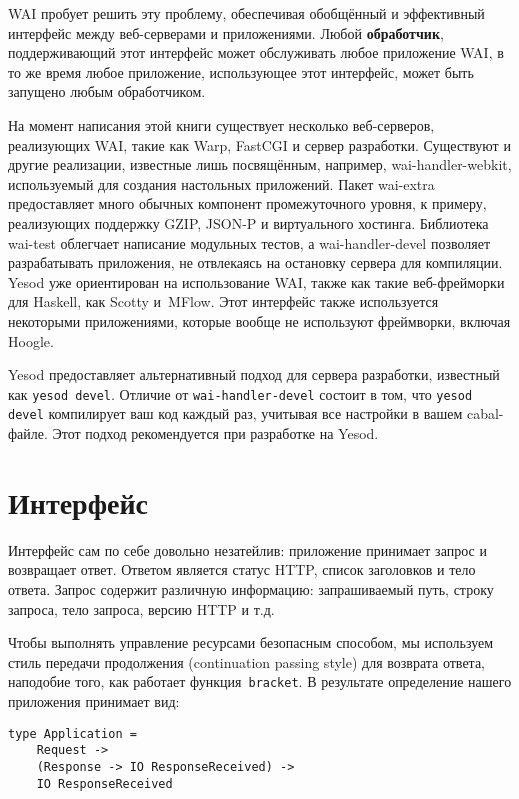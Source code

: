 WAI пробует решить эту проблему, обеспечивая обобщённый и эффективный интерфейс
между веб-серверами и приложениями. Любой \textbf{обработчик}, поддерживающий
этот интерфейс может обслуживать любое приложение WAI, в то же время любое
приложение, использующее этот интерфейс, может быть запущено любым
обработчиком.

На момент написания этой книги существует несколько веб-серверов, реализующих
WAI, такие как Warp, FastCGI и сервер разработки. Существуют и другие
реализации, известные лишь посвящённым, например, wai-handler-webkit,
используемый для создания настольных приложений. Пакет wai-extra предоставляет
много обычных компонент промежуточного уровня, к примеру, реализующих поддержку
GZIP, JSON-P и виртуального хостинга. Библиотека wai-test облегчает написание
модульных тестов, а wai-handler-devel позволяет разрабатывать приложения, не
отвлекаясь на остановку сервера для компиляции.  Yesod уже ориентирован на
использование WAI, также как такие веб-фрейморки для Haskell, как Scotty
и~MFlow. Этот интерфейс также используется некоторыми приложениями, которые
вообще не используют фреймворки, включая Hoogle.

\begin{remark}
    Yesod предоставляет альтернативный подход для сервера разработки, известный
    как \texttt{yesod devel}. Отличие от \texttt{wai-handler-devel} состоит в
    том, что \texttt{yesod devel} компилирует ваш код каждый раз, учитывая все
    настройки в вашем cabal-файле.  Этот подход рекомендуется при разработке на
    Yesod.
\end{remark}

\section {Интерфейс}
Интерфейс сам по себе довольно незатейлив: приложение принимает запрос и
возвращает ответ. Ответом является статус HTTP, список заголовков и тело
ответа.  Запрос содержит различную информацию: запрашиваемый путь, строку
запроса, тело запроса, версию HTTP и т.д.

Чтобы выполнять управление ресурсами безопасным способом, мы используем стиль
передачи продолжения (continuation passing style) для возврата ответа,
наподобие того, как работает функция~\lstinline'bracket'. В результате
определение нашего приложения принимает вид:
\begin{lstlisting}
type Application =
    Request ->
    (Response -> IO ResponseReceived) ->
    IO ResponseReceived
\end{lstlisting}

